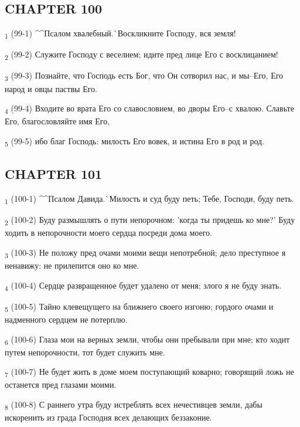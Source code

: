 \subsection{CHAPTER 100}
\begin{tcolorbox}
\textsubscript{1} (99-1) ^^Псалом хвалебный.^^ Воскликните Господу, вся земля!
\end{tcolorbox}
\begin{tcolorbox}
\textsubscript{2} (99-2) Служите Господу с веселием; идите пред лице Его с восклицанием!
\end{tcolorbox}
\begin{tcolorbox}
\textsubscript{3} (99-3) Познайте, что Господь есть Бог, что Он сотворил нас, и мы--Его, Его народ и овцы паствы Его.
\end{tcolorbox}
\begin{tcolorbox}
\textsubscript{4} (99-4) Входите во врата Его со славословием, во дворы Его--с хвалою. Славьте Его, благословляйте имя Его,
\end{tcolorbox}
\begin{tcolorbox}
\textsubscript{5} (99-5) ибо благ Господь: милость Его вовек, и истина Его в род и род.
\end{tcolorbox}
\subsection{CHAPTER 101}
\begin{tcolorbox}
\textsubscript{1} (100-1) ^^Псалом Давида.^^ Милость и суд буду петь; Тебе, Господи, буду петь.
\end{tcolorbox}
\begin{tcolorbox}
\textsubscript{2} (100-2) Буду размышлять о пути непорочном: 'когда ты придешь ко мне?' Буду ходить в непорочности моего сердца посреди дома моего.
\end{tcolorbox}
\begin{tcolorbox}
\textsubscript{3} (100-3) Не положу пред очами моими вещи непотребной; дело преступное я ненавижу: не прилепится оно ко мне.
\end{tcolorbox}
\begin{tcolorbox}
\textsubscript{4} (100-4) Сердце развращенное будет удалено от меня; злого я не буду знать.
\end{tcolorbox}
\begin{tcolorbox}
\textsubscript{5} (100-5) Тайно клевещущего на ближнего своего изгоню; гордого очами и надменного сердцем не потерплю.
\end{tcolorbox}
\begin{tcolorbox}
\textsubscript{6} (100-6) Глаза мои на верных земли, чтобы они пребывали при мне; кто ходит путем непорочности, тот будет служить мне.
\end{tcolorbox}
\begin{tcolorbox}
\textsubscript{7} (100-7) Не будет жить в доме моем поступающий коварно; говорящий ложь не останется пред глазами моими.
\end{tcolorbox}
\begin{tcolorbox}
\textsubscript{8} (100-8) С раннего утра буду истреблять всех нечестивцев земли, дабы искоренить из града Господня всех делающих беззаконие.
\end{tcolorbox}
